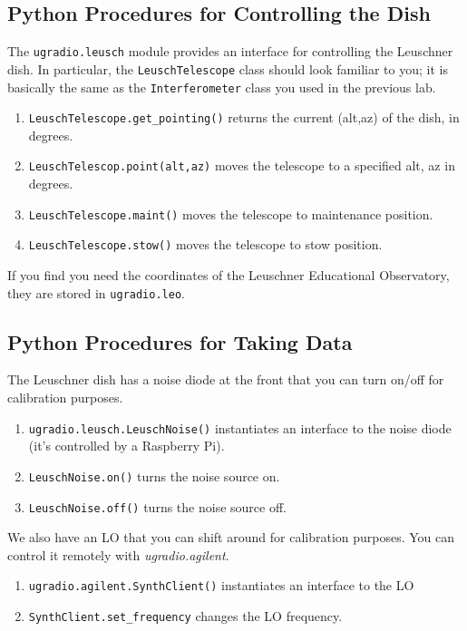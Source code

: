 \documentclass[psfig,preprint]{aastex}
\begin{document}
\subsection{Python Procedures for Controlling the Dish}

\noindent
The {\tt ugradio.leusch} module provides an interface for controlling
the Leuschner dish.  In particular, the {\tt LeuschTelescope} class should
look familiar to you; it is basically the same as the {\tt Interferometer}
class you used in the previous lab.

\begin{enumerate}
\item {\tt LeuschTelescope.get\_pointing()} returns the current (alt,az) of the dish, in degrees.
\item {\tt LeuschTelescop.point(alt,az)} moves the telescope to a specified alt, az in degrees.
\item {\tt LeuschTelescope.maint()} moves the telescope to maintenance position.
\item {\tt LeuschTelescope.stow()} moves the telescope to stow position.
\end{enumerate}

\noindent
If you find you need the coordinates of the Leuschner Educational Observatory, they are stored in
{\tt ugradio.leo}.

\subsection{Python Procedures for Taking Data}

\noindent
The Leuschner dish has a noise diode at the front that you can turn on/off for
calibration purposes.
\begin{enumerate}
\item {\tt ugradio.leusch.LeuschNoise()} instantiates an interface to the noise diode (it's controlled
by a Raspberry Pi).
\item {\tt LeuschNoise.on()} turns the noise source on.
\item {\tt LeuschNoise.off()} turns the noise source off.
\end{enumerate}

We also have an LO that you can shift around for calibration purposes.
You can control it remotely with {\it ugradio.agilent}. 
\begin{enumerate}
\item {\tt ugradio.agilent.SynthClient()} instantiates an interface to the LO
\item {\tt SynthClient.set\_frequency} changes the LO frequency.
\end{enumerate}
\end{document}
